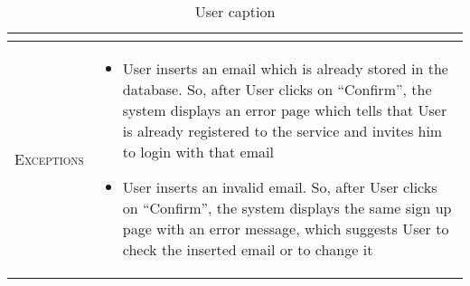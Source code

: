 \begin{table}[H]
\begin{tabular}[c]{|l|p{}|}
\begin{itemize}
    	\end{itemize}\\
    	\hline %
    	\textsc{Exceptions}         &  \begin{itemize}
    	    \item User inserts an email which is already stored in the database. So, after User clicks on “Confirm”, the system displays an error page which tells that User is already registered to the service and invites him to login with that email
            \item User inserts an invalid email. So, after User clicks on “Confirm”, the system displays the same sign up page with an error message, which suggests User to check the inserted email or to change it

    	\end{itemize}\\
    	\hline %
        
    \end{tabular}
    \caption{\label{tab:user_login}User caption }
\end{table}